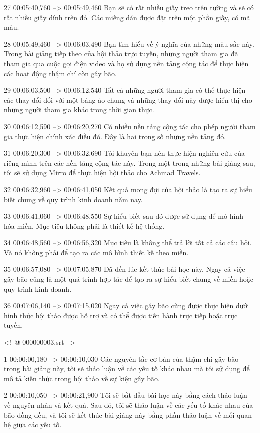 27
00:05:40,760 --> 00:05:49,460
Bạn sẽ có rất nhiều giấy treo trên tường và sẽ có rất nhiều giấy dính trên đó.  Các miếng dán được đặt trên một phần giấy, có mã màu.

28
00:05:49,460 --> 00:06:03,490
Bạn tìm hiểu về ý nghĩa của những màu sắc này.  Trong bài giảng tiếp theo của hội thảo trực tuyến, những người tham gia đã tham gia qua cuộc gọi điện video và họ sử dụng nền tảng cộng tác để thực hiện các hoạt động thậm chí còn gây bão.

29
00:06:03,500 --> 00:06:12,540
Tất cả những người tham gia có thể thực hiện các thay đổi đối với một bảng ảo chung và những thay đổi này được hiển thị cho những người tham gia khác trong thời gian thực.

30
00:06:12,590 --> 00:06:20,270
Có nhiều nền tảng cộng tác cho phép người tham gia thực hiện chính xác điều đó.  Đây là hai trong số những nền tảng đó.

31
00:06:20,300 --> 00:06:32,690
Tôi khuyên bạn nên thực hiện nghiên cứu của riêng mình trên các nền tảng cộng tác này.  Trong một trong những bài giảng sau, tôi sẽ sử dụng Mirro để thực hiện hội thảo cho Achmad Travels.

32
00:06:32,960 --> 00:06:41,050
Kết quả mong đợi của hội thảo là tạo ra sự hiểu biết chung về quy trình kinh doanh năm nay.

33
00:06:41,060 --> 00:06:48,550
Sự hiểu biết sau đó được sử dụng để mô hình hóa miền.  Mục tiêu không phải là thiết kế hệ thống.

34
00:06:48,560 --> 00:06:56,320
Mục tiêu là không thể trả lời tất cả các câu hỏi.  Và nó không phải để tạo ra các mô hình thiết kế theo miền.

35
00:06:57,080 --> 00:07:05,870
Đã đến lúc kết thúc bài học này.  Ngay cả việc gây bão cũng là một quá trình hợp tác để tạo ra sự hiểu biết chung về miền hoặc quy trình kinh doanh.

36
00:07:06,140 --> 00:07:15,020
Ngay cả việc gây bão cũng được thực hiện dưới hình thức hội thảo được hỗ trợ và có thể được tiến hành trực tiếp hoặc trực tuyến.

<!--@ 000000003.srt -->

1
00:00:00,180 --> 00:00:10,030
Các nguyên tắc cơ bản của thậm chí gây bão trong bài giảng này, tôi sẽ thảo luận về các yếu tố khác nhau mà tôi sử dụng để mô tả kiến ​​thức trong hội thảo về sự kiện gây bão.

2
00:00:10,050 --> 00:00:21,900
Tôi sẽ bắt đầu bài học này bằng cách thảo luận về nguyên nhân và kết quả.  Sau đó, tôi sẽ thảo luận về các yếu tố khác nhau của bão đồng đều, và tôi sẽ kết thúc bài giảng này bằng phần thảo luận về mối quan hệ giữa các yếu tố.

